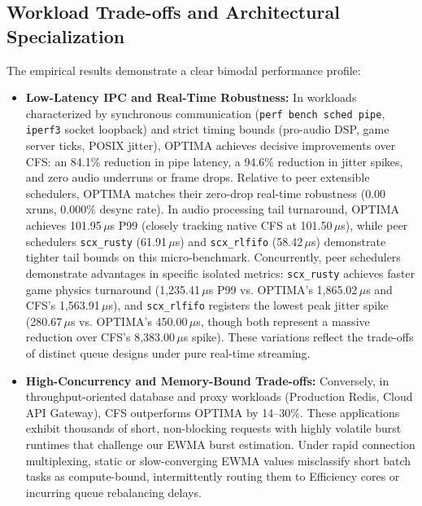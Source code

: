 \documentclass[letterpaper,twocolumn,10pt]{article}
\begin{document}
\subsection{Workload Trade-offs and Architectural Specialization}
The empirical results demonstrate a clear bimodal performance profile:
\begin{itemize}
    \item \textbf{Low-Latency IPC and Real-Time Robustness:} In workloads characterized by synchronous communication (\texttt{perf bench sched pipe}, \texttt{iperf3} socket loopback) and strict timing bounds (pro-audio DSP, game server ticks, POSIX jitter), OPTIMA achieves decisive improvements over CFS: an 84.1\% reduction in pipe latency, a 94.6\% reduction in jitter spikes, and zero audio underruns or frame drops. Relative to peer extensible schedulers, OPTIMA matches their zero-drop real-time robustness (0.00 xruns, 0.000\% desync rate). In audio processing tail turnaround, OPTIMA achieves 101.95\,$\mu$s P99 (closely tracking native CFS at 101.50\,$\mu$s), while peer schedulers \texttt{scx\_rusty} (61.91\,$\mu$s) and \texttt{scx\_rlfifo} (58.42\,$\mu$s) demonstrate tighter tail bounds on this micro-benchmark. Concurrently, peer schedulers demonstrate advantages in specific isolated metrics: \texttt{scx\_rusty} achieves faster game physics turnaround (1,235.41\,$\mu$s P99 vs. OPTIMA's 1,865.02\,$\mu$s and CFS's 1,563.91\,$\mu$s), and \texttt{scx\_rlfifo} registers the lowest peak jitter spike (280.67\,$\mu$s vs. OPTIMA's 450.00\,$\mu$s, though both represent a massive reduction over CFS's 8,383.00\,$\mu$s spike). These variations reflect the trade-offs of distinct queue designs under pure real-time streaming.
    \item \textbf{High-Concurrency and Memory-Bound Trade-offs:} Conversely, in throughput-oriented database and proxy workloads (Production Redis, Cloud API Gateway), CFS outperforms OPTIMA by 14--30\%. These applications exhibit thousands of short, non-blocking requests with highly volatile burst runtimes that challenge our EWMA burst estimation. Under rapid connection multiplexing, static or slow-converging EWMA values misclassify short batch tasks as compute-bound, intermittently routing them to Efficiency cores or incurring queue rebalancing delays.
\end{itemize}
\end{document}
